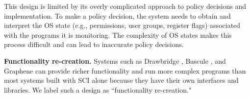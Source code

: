 
This design is limited by its overly complicated approach to policy
decisions and implementation.
To make a policy decision, the system needs to
obtain and interpret the OS state (e.g., permissions, user groups, register flags)
associated with the programs it is monitoring.
The complexity of OS states makes this process difficult and can lead to
inaccurate policy decisions.

\noindent
\textbf{Functionality re-creation.}
Systems such as Drawbridge \cite{Drawbridge-11},
Bascule \cite{Bascule}, and Graphene \cite{Graphene-14} can
provide richer functionality and run more complex programs than most systems built
with SCI alone because they have their own
interfaces and libraries. We label such a design
as ``functionality re-creation."

